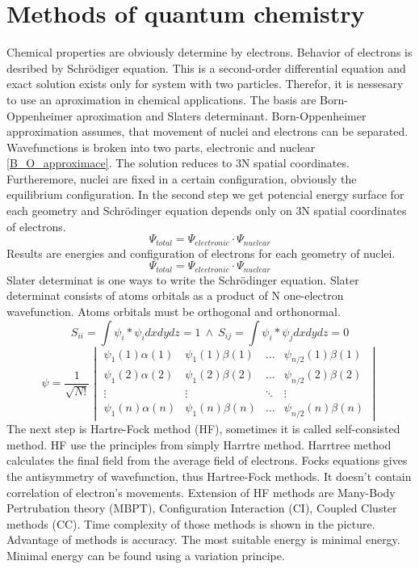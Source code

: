 \documentclass[
  digital, %
  table,   %
  lof,     %
  lot,     %
]{fithesis3}
\begin{document}
\section{Methods of quantum chemistry}
Chemical properties are obviously determine by electrons. Behavior of electrons is desribed by Schrödiger equation. This is a second-order differential equation and exact solution exists only for system with two particles. Therefor, it is nessesary to use an aproximation in chemical applications. The basis are Born-Oppenheimer aproximation and Slaters determinant. Born-Oppenheimer approximation assumes, that movement of nuclei and electrons can be separated. Wavefunctions is broken into two parts, electronic and nuclear \ref{B_O_approximace}. The solution reduces to 3N spatial coordinates. Furtheremore, nuclei are fixed in a certain configuration, obviously the equilibrium configuration. In the second step we get potencial energy surface for each geometry and Schrödinger equation depends only on 3N spatial coordinates of electrons.
\begin{equation}
  \Psi_{total} = \Psi_{electronic} \cdot \Psi_{nuclear}
  \label{B_O_approximace}
\end{equation}
 Results are energies and configuration of electrons for each geometry of nuclei.
\begin{equation}
\Psi_{total} = \Psi_{electronic} \cdot \Psi_{nuclear}
\end{equation}
Slater determinat is one ways to write the Schrödinger equation. Slater determinat consists of atoms orbitals as a product of N one-electron wavefunction. Atoms orbitals must be orthogonal and orthonormal.
\begin{equation}
S_{ii} = \int \psi_i * \psi_i dx dy dz = 1 ~ \wedge ~ S_{ij} = \int \psi_i * \psi_j dx dy dz = 0
\end{equation}
\begin{equation}
\psi =  \frac{1}{\sqrt{N!}}\begin{vmatrix}
\psi_1(1)\alpha(1) & \psi_1(1) \beta (1)  & \dots & \psi_{n/2}(1)\beta(1) \\
\psi_1(2)\alpha(2) & \psi_1(2) \beta (2) & \dots & \psi_{n/2}(2)\beta(2) \\
\vdots             & \vdots                           & \ddots & \vdots \\
\psi_1(n)\alpha(n) & \psi_1(n) \beta (n) & \dots & \psi_{n/2}(n)\beta(n)
\end{vmatrix}
\label{Slateruv_determinant}
\end{equation}
The next step is Hartre-Fock method (HF), sometimes it is called self-consisted method. HF use the principles from simply Harrtre method. Harrtree method calculates the final field from the average field of electrons. Focks equations gives the antisymmetry of wavefunction, thus Hartree-Fock methods. It doesn't contain correlation of electron's movements. Extension of HF methods are Many-Body Pertrubation theory (MBPT), Configuration Interaction (CI), Coupled
Cluster methods (CC). Time complexity of those methods is shown in the picture. Advantage of methods is accuracy.
The most suitable energy is minimal energy. Minimal energy can be found using a variation principe.
\end{document}
